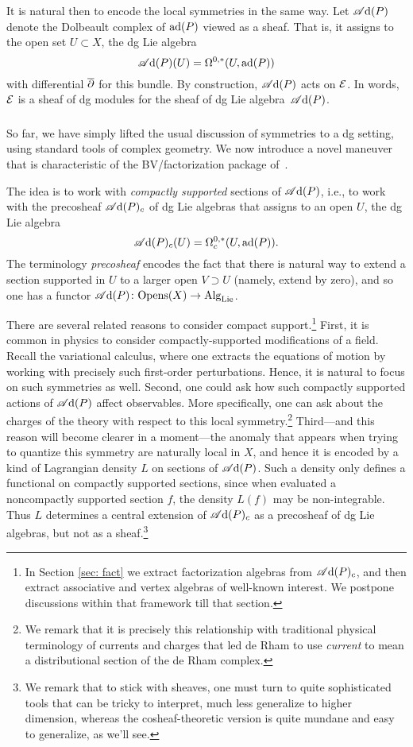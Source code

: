 It is natural then to encode the local symmetries in the same way.
Let $\mathscr A{\rm d}(P)$ denote the Dolbeault complex of ${\rm ad}(P)$ viewed as a sheaf.
That is, it assigns to the open set $U \subset X$, the dg Lie algebra 
\[
\mathscr A{\rm d}(P)(U) = \Omega^{0,*}(U,{\rm ad}(P))
\]
with differential $\overline{\partial}$ for this bundle.
By construction, $\mathscr A{\rm d}(P)$ acts on $\mathcal E$.
In words, $\mathcal E$ is a sheaf of dg modules for the sheaf of dg Lie algebra~$\mathscr A{\rm d}(P)$.

\subsubsection{}

So far, we have simply lifted the usual discussion of symmetries to a dg setting,
using standard tools of complex geometry.
We now introduce a novel maneuver that is characteristic of the BV/factorization package of~\cite{CG1,CG2}.

The idea is to work with {\em compactly supported} sections of $\mathscr A{\rm d}(P)$, 
i.e., to work with the precosheaf $\mathscr A{\rm d}(P)_c$ of dg Lie algebras that assigns to an open $U$,
the dg Lie algebra
\[
\mathscr A{\rm d}(P)_c(U) = \Omega^{0,*}_c(U,{\rm ad}(P)).
\]
The terminology {\em precosheaf} encodes the fact that there is natural way to extend a section supported in $U$ to a larger open $V \supset U$ (namely, extend by zero),
and so one has a functor $\mathscr A{\rm d}(P) \colon {\rm Opens}(X) \to {\rm Alg}_{\rm Lie}$.

There are several related reasons to consider compact support.\footnote{In Section \ref{sec: fact} we extract factorization algebras from $\mathscr A{\rm d}(P)_c$,
and then extract associative and vertex algebras of well-known interest.
We postpone discussions within that framework till that section.}
First, it is common in physics to consider compactly-supported modifications of a field.
Recall the variational calculus, where one extracts the equations of motion by working with precisely such first-order perturbations.
Hence, it is natural to focus on such symmetries as well.
Second, one could ask how such compactly supported actions of $\mathscr A{\rm d}(P)$ affect observables.
More specifically, one can ask about the charges of the theory with respect to this local symmetry.\footnote{We remark that it is precisely this relationship with traditional physical terminology of currents and charges that led de Rham to use {\em current} to mean a distributional section of the de Rham complex.}
Third---and this reason will become clearer in a moment---the anomaly that appears when trying to quantize this symmetry are naturally local in $X$, and hence it is encoded by a kind of Lagrangian density $L$ on sections of $\mathscr A{\rm d}(P)$.
Such a density only defines a functional on compactly supported sections,
since when evaluated a noncompactly supported section $f$, the density $L(f)$ may be non-integrable.
Thus $L$ determines a central extension of $\mathscr A{\rm d}(P)_c$ as a precosheaf of dg Lie algebras,
but not as a sheaf.\footnote{We remark that to stick with sheaves, one must turn to quite sophisticated tools \cite{WittenGr,GetzlerGM,ManBeilSch} that can be tricky to interpret, much less generalize to higher dimension, whereas the cosheaf-theoretic version is quite mundane and easy to generalize, as we'll see.}

